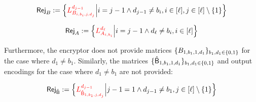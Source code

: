  \begin{equation}\label{rejB}
\mathsf{Rej}_B:=\Big\{{\color{red}L_{B_{i,b_i,j,d_j}}^{d_{j-1}}}\Big | i = j-1\land d_{j-1} \neq b_i, i\in[\ell], j\in[\ell]\setminus \{1\}\Big\}
         \end{equation}
         
          \begin{equation}\label{rejA}
\mathsf{Rej}_A:=\Big\{{\color{red}L_{A_{i,b_i}}^{d_{\ell}}}\Big | i = j-1\land d_{\ell} \neq b_i, i\in[\ell]\Big\}
         \end{equation}
         
         
         
Furthermore, the encryptor does not provide matrices $\{B_{1,b_1,1,d_1}\}_{b_1,d_1\in\{0,1\}}$ for the case where $d_1\neq b_1$. Similarly, the matrices $\{\mathsf{\hat{B}}_{1,b_1,1,d_1}\}_{b_1,d_1\in\{0,1\}}$ and output encodings for the case where $d_1\neq b_1$ are not provided:
  
  
   \begin{equation}\label{rejhB}
\mathsf{Rej}_{\mathsf{\hat{B}}}:=\Big\{{\color{red}L_{\mathsf{\hat{B}}_{1,b_1,j,d_j}}^{d_{j-1}}}\Big | j-1=1\land d_{j-1} \neq b_1, j\in[\ell]\setminus \{1\}\Big\}
         \end{equation}
         
